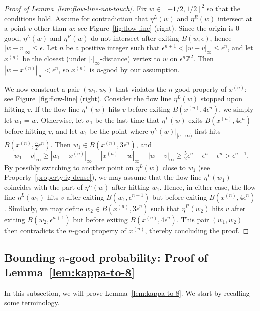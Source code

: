 \documentclass[a4paper]{article}
\numberwithin{equation}{section}
\numberwithin{equation}{section}
\renewcommand{\1}{\mathbf{1}}
\begin{document}
\begin{proof}[Proof of Lemma~\ref{lem:flow-line-not-touch}]
    Fix $w \in [-1/2,1/2]^2$ so that the conditions hold. Assume for contradiction that $\eta^L(w)$ and $\eta^R(w)$ intersect at a point $v$ other than $w$; see Figure~\ref{fig:flow-line} (right). Since the origin is $0$-good, $\eta^L(w)$ and $\eta^R(w)$ do not intersect after exiting $B(w,\epsilon)$, hence $|w-v|_\infty \leq \epsilon$. Let $n$ be a positive integer such that $\epsilon^{n+1} < |w-v|_\infty \le \epsilon^n$, and let $x^{(n)}$ be the closest (under $|\cdot|_\infty$-distance) vertex to $w$ on $\epsilon^n \mathbb{Z}^2$. Then $|w-x^{(n)}|_\infty<\epsilon^n$, so $x^{(n)}$ is $n$-good by our assumption.

    We now construct a pair $(w_1,w_2)$ that violates the $n$-good property of $x^{(n)}$; see Figure~\ref{fig:flow-line} (right). Consider the flow line $\eta^L(w)$ stopped upon hitting $v$. If the flow line $\eta^L(w)$ hits $v$ before exiting $B(x^{(n)},4\epsilon^n)$, we simply let $w_1=w$. Otherwise, let $\sigma_1$ be the last time that $\eta^L(w)$ exits $B(x^{(n)},4\epsilon^n)$ before hitting $v$, and let $w_1$ be the point where $\eta^L(w)|_{[\sigma_1,\infty)}$ first hits $\overline{B(x^{(n)},\frac{5}{2}\epsilon^n)}$. Then $w_1 \in B(x^{(n)},3\epsilon^n)$, and
    \[ |w_1-v|_\infty \ge |w_1-x^{(n)}|_\infty-|x^{(n)}-w|_\infty-|w-v|_\infty \ge \tfrac{5}{2}\epsilon^n-\epsilon^n-\epsilon^n>\epsilon^{n+1}. \]
    By possibly switching to another point on $\eta^L(w)$ close to $w_1$ (see Property~\eqref{property:ig-dense}), we may assume that the flow line $\eta^L(w_1)$ coincides with the part of $\eta^L(w)$ after hitting $w_1$.
    Hence, in either case, the flow line $\eta^L(w_1)$ hits $v$ after exiting $B(w_1,\epsilon^{n+1})$ but before exiting $B(x^{(n)},4\epsilon^n)$. Similarly, we may define $w_2 \in B(x^{(n)},3\epsilon^n)$ such that $\eta^R(w_2)$ hits $v$ after exiting $B(w_2,\epsilon^{n+1})$ but before exiting $B(x^{(n)},4\epsilon^n)$. This pair $(w_1,w_2)$ then contradicts the $n$-good property of $x^{(n)}$, thereby concluding the proof.
\end{proof}

\subsection{Bounding $n$-good probability: Proof of Lemma~\ref{lem:kappa-to-8}}\label{subsec:n-good-probability}

In this subsection, we will prove Lemma~\ref{lem:kappa-to-8}. We start by recalling some terminology.
\end{document}
